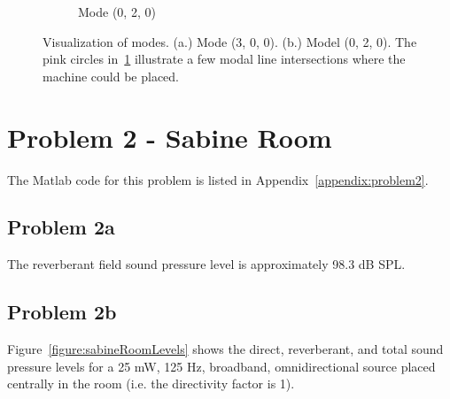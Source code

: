 {\begin{figure}[htbp]
\begin{subfigure}{0.5\textwidth}
            \caption{Mode (0, 2, 0)}
            \label{fig:sub2}
    \end{subfigure}
    \vspace{0.5cm}
    \caption{Visualization of modes.  (a.) Mode (3, 0, 0).  (b.) Model (0, 2, 0).  The pink circles in~\ref{fig:sub2} illustrate a few modal line intersections where the machine could be placed.}
    \label{fig:modeVisualization}     
\end{figure}






\newpage
\section*{Problem 2 - Sabine Room}

The Matlab code for this problem is listed in Appendix~\ref{appendix:problem2}.


\vspace{0.25cm}
\subsection*{Problem 2a}

The reverberant field sound pressure level is approximately 98.3 dB SPL.




\vspace{0.25cm}
\subsection*{Problem 2b}

Figure~\ref{figure:sabineRoomLevels} shows the direct, reverberant, and total sound pressure levels for a 25 mW, 125 Hz, broadband, omnidirectional source placed centrally in the room (i.e. the directivity factor is 1).

}
